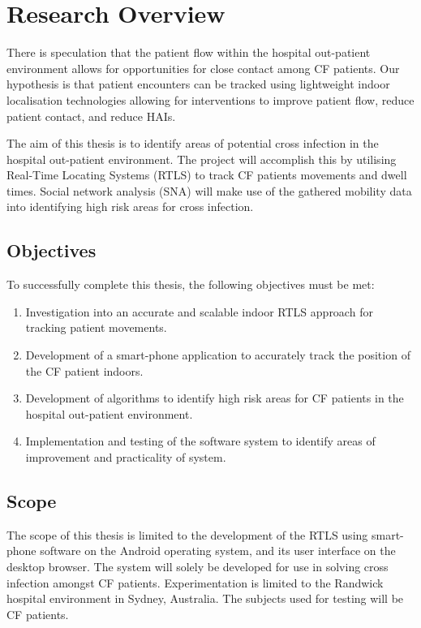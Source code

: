 	\section{Research Overview} \label{sec:intro_aim}
    	There is speculation that the patient flow within the hospital out-patient environment allows for opportunities for close contact among CF patients. Our hypothesis is that patient encounters can be tracked using lightweight indoor localisation technologies allowing for interventions to improve patient flow, reduce patient contact, and reduce HAIs.
        
    	The aim of this thesis is to identify areas of potential cross infection in the hospital out-patient environment. The project will accomplish this by utilising Real-Time Locating Systems (RTLS) to track CF patients movements and dwell times. Social network analysis (SNA) will make use of the gathered mobility data into identifying high risk areas for cross infection.
    
      \subsection{Objectives} \label{ssec:intro_aim_objectives}
      	To successfully complete this thesis, the following objectives must be met:
        \begin{enumerate}
			\item Investigation into an accurate and scalable indoor RTLS approach for tracking patient movements.
            \item Development of a smart-phone application to accurately track the position of the CF patient indoors.
            \item Development of algorithms to identify high risk areas for CF patients in the hospital out-patient environment.
            \item Implementation and testing of the software system to identify areas of improvement and practicality of system.
		\end{enumerate}

      \subsection{Scope} \label{ssec:intro_aim_scope}
      	The scope of this thesis is limited to the development of the RTLS using smart-phone software on the Android operating system, and its user interface on the desktop browser. The system will solely be developed for use in solving cross infection amongst CF patients. Experimentation is limited to the Randwick hospital environment in Sydney, Australia. The subjects used for testing will be CF patients. 
      
